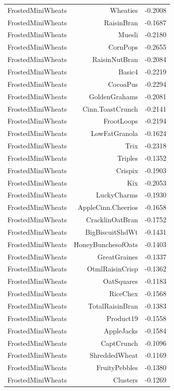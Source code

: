 \begin{longtable}{@{}lrr@{}}
FrostedMiniWheats & Wheaties & -0.2008 \\
FrostedMiniWheats & RaisinBran & -0.1687 \\
FrostedMiniWheats & Muesli & -0.2180 \\
FrostedMiniWheats & CornPops & -0.2655 \\
FrostedMiniWheats & RaisinNutBran & -0.2084 \\
FrostedMiniWheats & Basic4 & -0.2219 \\
FrostedMiniWheats & CocoaPus & -0.2294 \\
FrostedMiniWheats & GoldenGrahams & -0.2081 \\
FrostedMiniWheats & Cinn.ToastCrunch & -0.2141 \\
FrostedMiniWheats & FrootLoops & -0.2194 \\
FrostedMiniWheats & LowFatGranola & -0.1624 \\
FrostedMiniWheats & Trix & -0.2318 \\
FrostedMiniWheats & Triples & -0.1352 \\
FrostedMiniWheats & Crispix & -0.1903 \\
FrostedMiniWheats & Kix & -0.2053 \\
FrostedMiniWheats & LuckyCharms & -0.1930 \\
FrostedMiniWheats & AppleCinn.Cheerios & -0.1658 \\
FrostedMiniWheats & CracklinOatBran & -0.1752 \\
FrostedMiniWheats & BigBiscuitShdWt & -0.1431 \\
FrostedMiniWheats & HoneyBunchesofOats & -0.1403 \\
FrostedMiniWheats & GreatGraines & -0.1337 \\
FrostedMiniWheats & OtmlRaisinCrisp & -0.1362 \\
FrostedMiniWheats & OatSquares & -0.1183 \\
FrostedMiniWheats & RiceChex & -0.1568 \\
FrostedMiniWheats & TotalRaisinBran & -0.1383 \\
FrostedMiniWheats & Product19 & -0.1558 \\
FrostedMiniWheats & AppleJacks & -0.1584 \\
FrostedMiniWheats & CaptCrunch & -0.1096 \\
FrostedMiniWheats & ShreddedWheat & -0.1169 \\
FrostedMiniWheats & FruityPebbles & -0.1380 \\
FrostedMiniWheats & Clusters & -0.1269 \\

\end{longtable}
